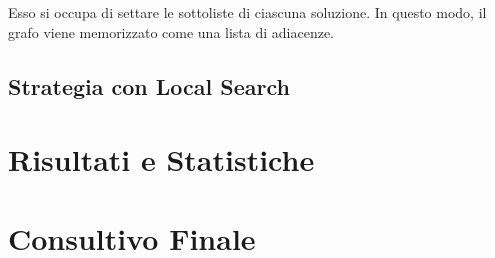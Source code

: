 \documentclass[a4paper,titlepage]{article}
\begin{document}
Esso si occupa di settare le sottoliste di ciascuna 
soluzione. In questo modo, il grafo viene memorizzato come una lista di adiacenze.

\subsection{Strategia con Local Search}


\section{Risultati e Statistiche}

\section{Consultivo Finale}
\end{document}
